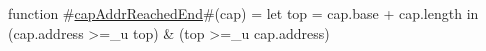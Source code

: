 function #\hyperref[zcapAddrReachedEnd]{capAddrReachedEnd}#(cap) =
    let top = cap.base + cap.length in
    (cap.address >=_u top) & (top >=_u cap.address)
